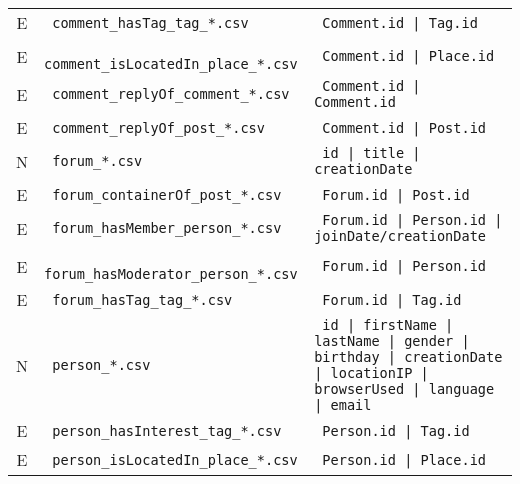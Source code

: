 \begin{table}[htb]
\begin{tabularx}{\linewidth}{|>{\sffamily}c|>{\tt}l|>{\tt}X|}
        E                    & comment\_hasTag\_tag\_*.csv             & Comment.id | Tag.id                                                                                        \\
        E                    & comment\_isLocatedIn\_place\_*.csv      & Comment.id | Place.id                                                                                      \\
        E                    & comment\_replyOf\_comment\_*.csv        & Comment.id | Comment.id                                                                                    \\
        E                    & comment\_replyOf\_post\_*.csv           & Comment.id | Post.id                                                                                       \\
        \hline
        N                    & forum\_*.csv                            & id | title | creationDate                                                                                  \\
        E                    & forum\_containerOf\_post\_*.csv         & Forum.id | Post.id                                                                                         \\
        E                    & forum\_hasMember\_person\_*.csv         & Forum.id | Person.id | joinDate/creationDate                                                               \\
        E                    & forum\_hasModerator\_person\_*.csv      & Forum.id | Person.id                                                                                       \\
        E                    & forum\_hasTag\_tag\_*.csv               & Forum.id | Tag.id                                                                                          \\
        \hline
        N                    & person\_*.csv                           & id | firstName | lastName | gender | birthday | creationDate | locationIP | browserUsed | language | email \\
        E                    & person\_hasInterest\_tag\_*.csv         & Person.id | Tag.id                                                                                         \\
        E                    & person\_isLocatedIn\_place\_*.csv       & Person.id | Place.id                                                                                       \\

\end{tabularx}
\end{table}

